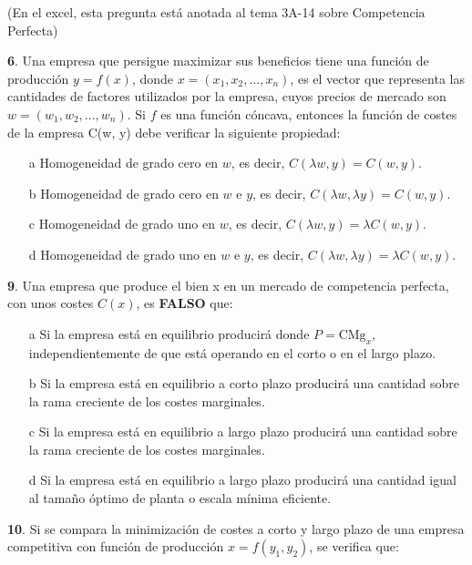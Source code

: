 \documentclass{nuevotema}
\begin{document}

(En el excel, esta pregunta está anotada al tema 3A-14 sobre Competencia Perfecta)

\textbf{6}. Una empresa que persigue maximizar sus beneficios tiene una función de producción $y=f(x)$, donde $x=(x_1, x_2, ..., x_n)$, es el vector que representa las cantidades de factores utilizados por la empresa, cuyos precios de mercado son $w=(w_1, w_2, ..., w_n)$. Si $f$ es una función cóncava, entonces la función de costes de la empresa C(w, y) debe verificar la siguiente propiedad:

\begin{enumerate}
	\item[a] Homogeneidad de grado cero en $w$, es decir, $C(\lambda w, y) = C(w,y)$.
	\item[b] Homogeneidad de grado cero en $w$ e $y$, es decir, $C(\lambda w, \lambda y)= C(w, y)$.
	\item[c] Homogeneidad de grado uno en $w$, es decir, $C(\lambda w, y) = \lambda C(w, y)$.
	\item[d] Homogeneidad de grado uno en $w$ e $y$, es decir, $C(\lambda w, \lambda y) = \lambda C(w, y)$.
\end{enumerate}


\textbf{9}. Una empresa que produce el bien x en un mercado de competencia perfecta, con unos costes $C(x)$, es \textbf{FALSO} que:

\begin{enumerate}
	\item[a] Si la empresa está en equilibrio producirá donde $P=\text{CMg}_x$, independientemente de que está operando en el corto o en el largo plazo.
	\item[b] Si la empresa está en equilibrio a corto plazo producirá una cantidad sobre la rama creciente de los costes marginales.
	\item[c] Si la empresa está en equilibrio a largo plazo producirá una cantidad sobre la rama creciente de los costes marginales.
	\item[d] Si la empresa está en equilibrio a largo plazo producirá una cantidad igual al tamaño óptimo de planta o escala mínima eficiente.
\end{enumerate}


\textbf{10}. Si se compara la minimización de costes a corto y largo plazo de una empresa competitiva con función de producción $x=f(y_1, y_2)$, se verifica que: 
\end{document}

